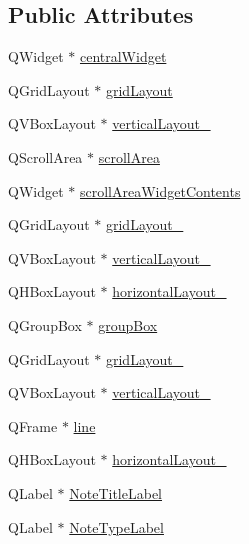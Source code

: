 \subsection*{Public Attributes}
\begin{DoxyCompactItemize}
\item 
Q\+Widget $\ast$ \hyperlink{classUi__MattyNotesClass_a2f1ad89276475aadfc0c1be6d8f387eb}{central\+Widget}
\item 
Q\+Grid\+Layout $\ast$ \hyperlink{classUi__MattyNotesClass_a854a660e1e7abdbd4548aa4b39969196}{grid\+Layout}
\item 
Q\+V\+Box\+Layout $\ast$ \hyperlink{classUi__MattyNotesClass_a387c14ba400cb9ab0b33b5000276d66b}{vertical\+Layout\+\_}
\item 
Q\+Scroll\+Area $\ast$ \hyperlink{classUi__MattyNotesClass_ae86843a493941b949a4ab67b1b85c2cf}{scroll\+Area}
\item 
Q\+Widget $\ast$ \hyperlink{classUi__MattyNotesClass_ab89cebba84d5ea3e808da6d0db9d673c}{scroll\+Area\+Widget\+Contents}
\item 
Q\+Grid\+Layout $\ast$ \hyperlink{classUi__MattyNotesClass_a568e0fe1cd6a4711a9e881b8855ad15a}{grid\+Layout\+\_}
\item 
Q\+V\+Box\+Layout $\ast$ \hyperlink{classUi__MattyNotesClass_a93592607728a9455d5914a0a6a3c8307}{vertical\+Layout\+\_}
\item 
Q\+H\+Box\+Layout $\ast$ \hyperlink{classUi__MattyNotesClass_a5c081a5789ce4ce85b7e3cbdeccb3184}{horizontal\+Layout\+\_}
\item 
Q\+Group\+Box $\ast$ \hyperlink{classUi__MattyNotesClass_a658cd965413e1623c38cda605681e4f7}{group\+Box}
\item 
Q\+Grid\+Layout $\ast$ \hyperlink{classUi__MattyNotesClass_a3fb284446d42efd061111a37e6806637}{grid\+Layout\+\_}
\item 
Q\+V\+Box\+Layout $\ast$ \hyperlink{classUi__MattyNotesClass_acc25665c3a621df2d59fcc3586cc4f16}{vertical\+Layout\+\_}
\item 
Q\+Frame $\ast$ \hyperlink{classUi__MattyNotesClass_acd1c3f25052cc5661975bbfb7b183b35}{line}
\item 
Q\+H\+Box\+Layout $\ast$ \hyperlink{classUi__MattyNotesClass_a5cb2d28d113d4b473d55b47c7370582c}{horizontal\+Layout\+\_}
\item 
Q\+Label $\ast$ \hyperlink{classUi__MattyNotesClass_a97f01bf32630dedfa41e7ad7a29d625f}{Note\+Title\+Label}
\item 
Q\+Label $\ast$ \hyperlink{classUi__MattyNotesClass_a48fa5329cbef0c993de74749b395e26f}{Note\+Type\+Label}

\end{DoxyCompactItemize}
